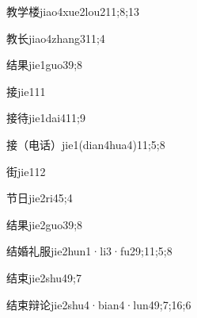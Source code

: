 \begin{verbete}{教学楼}{jiao4xue2lou2}{11;8;13}
\end{verbete}

\begin{verbete}{教长}{jiao4zhang3}{11;4}
\end{verbete}

\begin{verbete}{结果}{jie1guo3}{9;8}
\end{verbete}

\begin{verbete}{接}{jie1}{11}
\end{verbete}

\begin{verbete}{接待}{jie1dai4}{11;9}
\end{verbete}

\begin{verbete}{接（电话）}{jie1(dian4hua4)}{11;5;8}
\end{verbete}

\begin{verbete}{街}{jie1}{12}
\end{verbete}

\begin{verbete}{节日}{jie2ri4}{5;4}
\end{verbete}

\begin{verbete}{结果}{jie2guo3}{9;8}
\end{verbete}

\begin{verbete}{结婚礼服}{jie2hun1·li3·fu2}{9;11;5;8}
\end{verbete}

\begin{verbete}{结束}{jie2shu4}{9;7}
\end{verbete}

\begin{verbete}{结束辩论}{jie2shu4·bian4·lun4}{9;7;16;6}
\end{verbete}

